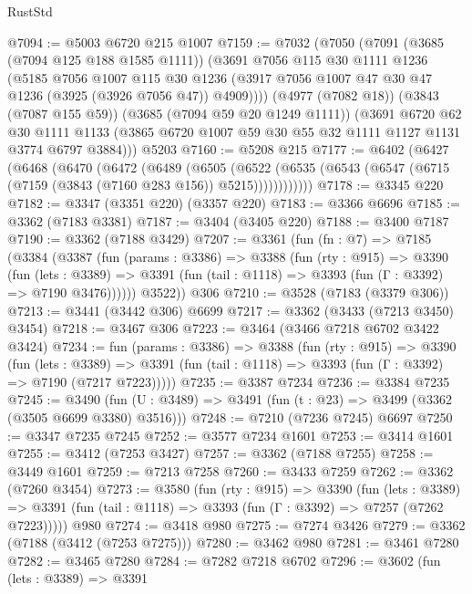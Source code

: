 \begin{lexlean}{RustStd}
\begin{coremodule}
@7094 := @5003 @6720 @215 @1007
@7159 := @7032
    (@7050
      (@7091
        (@3685 (@7094 @125 @188 @1585 @1111))
        (@3691
          @7056
          @115
          @30
          @1111
          @1236
          (@5185
            @7056
            @1007
            @115
            @30
            @1236
            (@3917 @7056 @1007 @47 @30 @47 @1236 (@3925 (@3926 @7056 @47)) @4909))))
      (@4977 (@7082 @18))
      (@3843 (@7087 @155 @59))
      (@3685 (@7094 @59 @20 @1249 @1111))
      (@3691
        @6720
        @62
        @30
        @1111
        @1133
        (@3865 @6720 @1007 @59 @30 @55 @32 @1111 @1127 @1131 @3774 @6797 @3884)))
    @5203
@7160 := @5208 @215
@7177 := @6402
    (@6427
      (@6468
        (@6470
          (@6472
            (@6489
              (@6505
                (@6522
                  (@6535 (@6543 (@6547 (@6715 (@7159 (@3843 (@7160 @283 @156)) @5215))))))))))))
@7178 := @3345 @220
@7182 := @3347 (@3351 @220) (@3357 @220)
@7183 := @3366 @6696
@7185 := @3362 (@7183 @3381)
@7187 := @3404 (@3405 @220)
@7188 := @3400 @7187
@7190 := @3362 (@7188 @3429)
@7207 := @3361
    (fun (fn : @7) =>
    @7185
      (@3384
        (@3387
          (fun (params : @3386) =>
          @3388
            (fun (rty : @915) =>
            @3390
              (fun (lets : @3389) =>
              @3391 (fun (tail : @1118) => @3393 (fun (Γ : @3392) => @7190 @3476))))))
        @3522))
    @306
@7210 := @3528 (@7183 (@3379 @306))
@7213 := @3441 (@3442 @306) @6699
@7217 := @3362 (@3433 (@7213 @3450) @3454)
@7218 := @3467 @306
@7223 := @3464 (@3466 @7218 @6702 @3422 @3424)
@7234 := fun (params : @3386) =>
  @3388
    (fun (rty : @915) =>
    @3390
      (fun (lets : @3389) =>
      @3391 (fun (tail : @1118) => @3393 (fun (Γ : @3392) => @7190 (@7217 @7223)))))
@7235 := @3387 @7234
@7236 := @3384 @7235
@7245 := @3490 (fun (U : @3489) => @3491 (fun (t : @23) => @3499 (@3362 (@3505 @6699 @3380) @3516)))
@7248 := @7210 (@7236 @7245) @6697
@7250 := @3347 @7235 @7245
@7252 := @3577 @7234 @1601
@7253 := @3414 @1601
@7255 := @3412 (@7253 @3427)
@7257 := @3362 (@7188 @7255)
@7258 := @3449 @1601
@7259 := @7213 @7258
@7260 := @3433 @7259
@7262 := @3362 (@7260 @3454)
@7273 := @3580
    (fun (rty : @915) =>
    @3390
      (fun (lets : @3389) =>
      @3391 (fun (tail : @1118) => @3393 (fun (Γ : @3392) => @7257 (@7262 @7223)))))
    @980
@7274 := @3418 @980
@7275 := @7274 @3426
@7279 := @3362 (@7188 (@3412 (@7253 @7275)))
@7280 := @3462 @980
@7281 := @3461 @7280
@7282 := @3465 @7280
@7284 := @7282 @7218 @6702
@7296 := @3602
    (fun (lets : @3389) =>
    @3391

\end{coremodule}
\end{lexlean}
